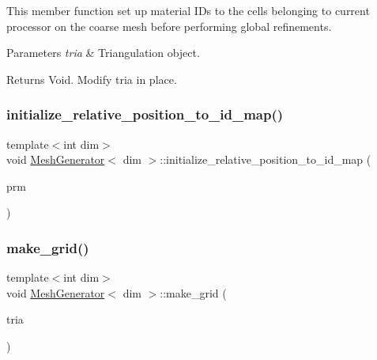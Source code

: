This member function set up material I\+Ds to the cells belonging to current processor on the coarse mesh before performing global refinements.


\begin{DoxyParams}{Parameters}
{\em tria} & Triangulation object. \\
\hline
\end{DoxyParams}
\begin{DoxyReturn}{Returns}
Void. Modify tria in place. 
\end{DoxyReturn}
\mbox{\label{class_mesh_generator_a6d216567b5b599cee526f33d435e6655}} 
\subsubsection{\texorpdfstring{initialize\+\_\+relative\+\_\+position\+\_\+to\+\_\+id\+\_\+map()}{initialize\_relative\_position\_to\_id\_map()}}
{\footnotesize\ttfamily template$<$int dim$>$ \\
void \hyperlink{class_mesh_generator}{Mesh\+Generator}$<$ dim $>$\+::initialize\+\_\+relative\+\_\+position\+\_\+to\+\_\+id\+\_\+map (\begin{DoxyParamCaption}\item[{Parameter\+Handler \&}]{prm }\end{DoxyParamCaption})\hspace{0.3cm}{\ttfamily [private]}}

\mbox{\label{class_mesh_generator_a27c6ff0b0c51700373ef9a1dc10abaaf}} 
\subsubsection{\texorpdfstring{make\+\_\+grid()}{make\_grid()}}
{\footnotesize\ttfamily template$<$int dim$>$ \\
void \hyperlink{class_mesh_generator}{Mesh\+Generator}$<$ dim $>$\+::make\+\_\+grid (\begin{DoxyParamCaption}\item[{parallel\+::distributed\+::\+Triangulation$<$ dim $>$ \&}]{tria }\end{DoxyParamCaption})}

